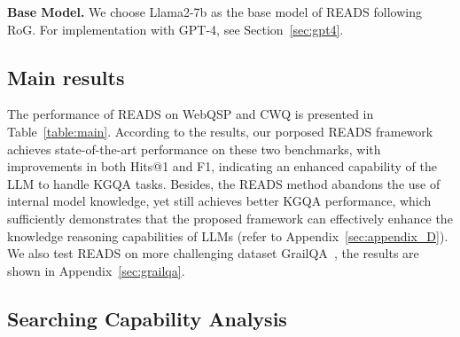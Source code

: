 \documentclass[11pt]{article}
\begin{document}
\noindent\textbf{Base Model.} We choose Llama2-7b as the base model of READS following RoG. For implementation with GPT-4, see Section~\ref{sec:gpt4}.

\subsection{Main results}

The performance of READS on WebQSP and CWQ is presented in Table~\ref{table:main}. According to the results, our porposed READS framework achieves state-of-the-art performance on these two benchmarks, with improvements in both Hits@1 and F1, indicating an enhanced capability of the LLM to handle KGQA tasks. Besides, the READS method abandons the use of internal model knowledge, yet still achieves better KGQA performance, which sufficiently demonstrates that the proposed framework can effectively enhance the knowledge reasoning capabilities of LLMs (refer to Appendix~\ref{sec:appendix_D}). We also test READS on more challenging dataset GrailQA~\cite{gu2021beyond}, the results are shown in Appendix~\ref{sec:grailqa}.







\subsection{Searching Capability Analysis}
\label{subsec:qualityofgraph}
\end{document}
